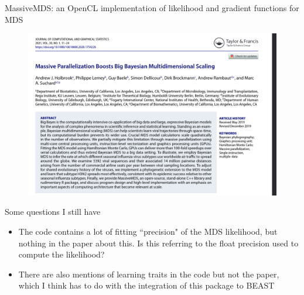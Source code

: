 \documentclass{beamer}
\begin{document}
\begin{frame}{MassiveMDS: an OpenCL implementation of likelihood and gradient functions for MDS}
    \begin{figure}
        \includegraphics[width=1.0\textwidth]{2022-10-03-21-17-16.png}
    \end{figure}   
\end{frame}

\begin{frame}{Some questions I still have}
    \begin{itemize}
        \item The code contains a lot of fitting ``precision" of the MDS likelihood, but nothing in the paper about this. Is this referring to the float precision used to compute the likelihood?
        \item There are also mentions of learning traits in the code but not the paper, which I think has to do with the integration of this package to BEAST
    \end{itemize}
\end{frame}

\begin{frame}[allowframebreaks]



\end{frame}
\end{document}
